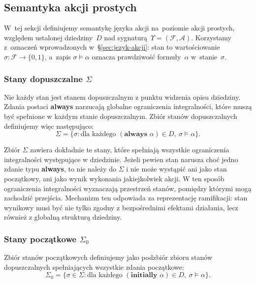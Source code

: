 \documentclass[11pt,a4paper]{article}
\theoremstyle{definition}
\begin{document}
\subsection{Semantyka akcji prostych}
\label{sec:sem-proste}

W~tej sekcji definiujemy semantykę języka akcji na~poziomie akcji prostych, względem ustalonej dziedziny~$D$ nad sygnaturą~$\Upsilon=(\mathcal{F},\mathcal{A})$. Korzystamy z~oznaczeń wprowadzonych w~\S\ref{sec:jezyk-akcji}: stan to wartościowanie $\sigma:\mathcal{F}\to\{0,1\}$, a~zapis $\sigma\models\alpha$ oznacza prawdziwość formuły~$\alpha$ w~stanie~$\sigma$.

\subsubsection{Stany dopuszczalne \texorpdfstring{$\Sigma$}{Sigma}}
\label{sec:stany-dopuszczalne}

Nie każdy stan jest stanem dopuszczalnym z punktu widzenia opisu dziedziny. Zdania postaci \textbf{always} narzucają globalne ograniczenia integralności, które muszą być spełnione w każdym stanie dopuszczalnym. Zbiór stanów dopuszczalnych definiujemy więc następująco:
\[
\Sigma = \{\sigma : \text{dla każdego } (\textbf{always }\alpha)\in D,\ \sigma \models \alpha\}.
\]

Zbiór $\Sigma$ zawiera dokładnie te stany, które spełniają wszystkie ograniczenia integralności występujące w dziedzinie. Jeżeli pewien stan narusza choć jedno zdanie typu \textbf{always}, to nie należy do $\Sigma$ i nie może wystąpić ani jako stan początkowy, ani jako wynik wykonania jakiejkolwiek akcji. W ten sposób ograniczenia integralności wyznaczają przestrzeń stanów, pomiędzy którymi mogą zachodzić przejścia. Mechanizm ten odpowiada za reprezentację ramifikacji: stan wynikowy musi być nie tylko zgodny z bezpośrednimi efektami działania, lecz również z globalną strukturą dziedziny.

\subsubsection{Stany początkowe \texorpdfstring{$\Sigma_0$}{Sigma\_0}}
\label{sec:stany-poczatkowe}

Zbiór stanów początkowych definiujemy jako podzbiór zbioru stanów dopuszczalnych spełniających wszystkie zdania początkowe:
\[
\Sigma_0 = \{\sigma \in \Sigma : \text{dla każdego } (\textbf{initially }\alpha)\in D,\ \sigma \models \alpha\}.
\]
\end{document}
